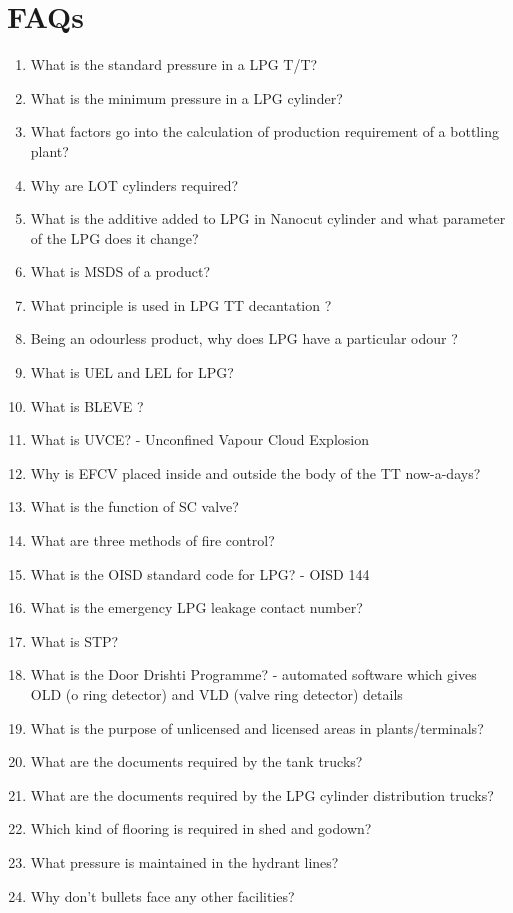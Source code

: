 \documentclass{report}
\begin{document}
	\chapter{FAQs}
	\begin{enumerate}
		\item What is the standard pressure in a LPG T/T?
		\item What is the minimum pressure in a LPG cylinder?
		\item What factors go into the calculation of production requirement of a bottling plant?
		\item Why are LOT cylinders required?
		\item What is the additive added to LPG in Nanocut cylinder and what parameter of the LPG does it change?
		\item What is MSDS of a product?
		\item What principle is used in LPG TT decantation ?
		\item Being an odourless product, why does LPG have a particular odour ?
		\item What is UEL and LEL for LPG?
		\item What is BLEVE ?
		\item What is UVCE? - Unconfined Vapour Cloud Explosion
		\item Why is EFCV placed inside and outside the body of the TT now-a-days?
		\item What is the function of SC valve?
		\item What are three methods of fire control? 
		\item What is the OISD standard code for LPG? - OISD 144
		\item What is the emergency LPG leakage contact number?
		\item What is STP?
		\item What is the Door Drishti Programme? - automated software which gives OLD (o ring detector) and VLD (valve ring detector) details
		\item What is the purpose of unlicensed and licensed areas in plants/terminals?
		\item What are the documents required by the tank trucks?
		\item What are the documents required by the LPG cylinder distribution trucks?
		\item Which kind of flooring is required in shed and godown?
		\item What pressure is maintained in the hydrant lines?
		\item Why don’t bullets face any other facilities?

\end{enumerate}
\end{document}
